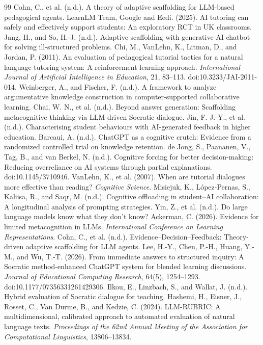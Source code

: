 \begin{thebibliography}{99}
\small
{} Cohn, C., et al. (n.d.). A theory of adaptive scaffolding for LLM-based pedagogical agents.
 LearnLM Team, Google and Eedi. (2025). AI tutoring can safely and effectively support students: An exploratory RCT in UK classrooms.
 Jang, H., and So, H.-J. (n.d.). Adaptive scaffolding with generative AI chatbot for solving ill-structured problems.
 Chi, M., VanLehn, K., Litman, D., and Jordan, P. (2011). An evaluation of pedagogical tutorial tactics for a natural language tutoring system: A reinforcement learning approach. \emph{International Journal of Artificial Intelligence in Education}, 21, 83--113. doi:10.3233/JAI-2011-014.
 Weinberger, A., and Fischer, F. (n.d.). A framework to analyze argumentative knowledge construction in computer-supported collaborative learning.
 Chai, W. N., et al. (n.d.). Beyond answer generation: Scaffolding metacognitive thinking via LLM-driven Socratic dialogue.
 Jin, F. J.-Y., et al. (n.d.). Characterising student behaviours with AI-generated feedback in higher education.
 Barcaui, A. (n.d.). ChatGPT as a cognitive crutch: Evidence from a randomized controlled trial on knowledge retention.
 de Jong, S., Paananen, V., Tag, B., and van Berkel, N. (n.d.). Cognitive forcing for better decision-making: Reducing overreliance on AI systems through partial explanations. doi:10.1145/3710946.
 VanLehn, K., et al. (2007). When are tutorial dialogues more effective than reading? \emph{Cognitive Science}.
 Misiejuk, K., L\'opez-Pernas, S., Kaliisa, R., and Saqr, M. (n.d.). Cognitive offloading in student--AI collaboration: A longitudinal analysis of prompting strategies.
 Yin, Z., et al. (n.d.). Do large language models know what they don't know?
 Ackerman, C. (2026). Evidence for limited metacognition in LLMs. \emph{International Conference on Learning Representations}.
 Cohn, C., et al. (n.d.). Evidence--Decision--Feedback: Theory-driven adaptive scaffolding for LLM agents.
 Lee, H.-Y., Chen, P.-H., Huang, Y.-M., and Wu, T.-T. (2026). From immediate answers to structured inquiry: A Socratic method-enhanced ChatGPT system for blended learning discussions. \emph{Journal of Educational Computing Research}, 64(5), 1254--1293. doi:10.1177/07356331261429306.
 Ilkou, E., Linzbach, S., and Wallat, J. (n.d.). Hybrid evaluation of Socratic dialogue for teaching.
 Hashemi, H., Eisner, J., Rosset, C., Van Durme, B., and Kedzie, C. (2024). LLM-RUBRIC: A multidimensional, calibrated approach to automated evaluation of natural language texts. \emph{Proceedings of the 62nd Annual Meeting of the Association for Computational Linguistics}, 13806--13834.

\end{thebibliography}
